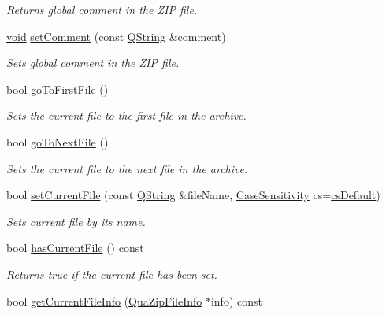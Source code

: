 \begin{DoxyCompactItemize}
\begin{DoxyCompactList}\small\item\em Returns global comment in the Z\-I\-P file. \end{DoxyCompactList}\item 
\hyperlink{group___u_a_v_objects_plugin_ga444cf2ff3f0ecbe028adce838d373f5c}{void} \hyperlink{class_qua_zip_a1b5d936a203859340574d5908ffa2222}{set\-Comment} (const \hyperlink{group___u_a_v_objects_plugin_gab9d252f49c333c94a72f97ce3105a32d}{Q\-String} \&comment)
\begin{DoxyCompactList}\small\item\em Sets global comment in the Z\-I\-P file. \end{DoxyCompactList}\item 
bool \hyperlink{class_qua_zip_a745488f9177bcec3cdb858587584e033}{go\-To\-First\-File} ()
\begin{DoxyCompactList}\small\item\em Sets the current file to the first file in the archive. \end{DoxyCompactList}\item 
bool \hyperlink{class_qua_zip_aee6779b6cd338420c2e8c5655fa8ba97}{go\-To\-Next\-File} ()
\begin{DoxyCompactList}\small\item\em Sets the current file to the next file in the archive. \end{DoxyCompactList}\item 
bool \hyperlink{class_qua_zip_a6c657bfcfccb59d728e0da24c677d899}{set\-Current\-File} (const \hyperlink{group___u_a_v_objects_plugin_gab9d252f49c333c94a72f97ce3105a32d}{Q\-String} \&file\-Name, \hyperlink{class_qua_zip_a6053a1d249ed210a85c9d5eb7cf9cdbe}{Case\-Sensitivity} cs=\hyperlink{class_qua_zip_a6053a1d249ed210a85c9d5eb7cf9cdbeac3cca8c0b976cf6397a28a5c84e75253}{cs\-Default})
\begin{DoxyCompactList}\small\item\em Sets current file by its name. \end{DoxyCompactList}\item 
bool \hyperlink{class_qua_zip_a00b237d926648f45da86db25e7cfb697}{has\-Current\-File} () const 
\begin{DoxyCompactList}\small\item\em Returns {\ttfamily true} if the current file has been set. \end{DoxyCompactList}\item 
bool \hyperlink{class_qua_zip_a9c91a53ed4c2038e153c64bdc097ebe8}{get\-Current\-File\-Info} (\hyperlink{struct_qua_zip_file_info}{Qua\-Zip\-File\-Info} $\ast$info) const 

\end{DoxyCompactItemize}
